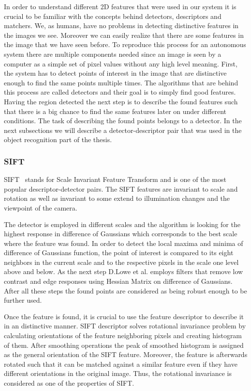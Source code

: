 In order to understand different 2D features that were used in our system it is crucial to be familiar with the concepts behind detectors, descriptors and matchers. We, as humans, have no problems in detecting distinctive features in the images we see. Moreover we can easily realize that there are some features in the image that we have seen before. To reproduce this process for an autonomous system there are multiple components needed since an image is seen by a computer as a simple set of pixel values without any high level meaning. First, the system has to detect points of interest in the image that are distinctive enough to find the same points multiple times. The algorithms that are behind this process are called detectors and their goal is to simply find good features. Having the region detected the next step is to describe the found features such that there is a big chance to find the same features later on under different conditions. The task of describing the found points belongs to a detector. In the next subsections we will describe a detector-descriptor pair that was used in the object recognition part of the thesis.

\subsubsection{SIFT}
SIFT~\cite{lowe2004distinctive} stands for Scale Invariant Feature Transform and is one of the most popular descriptor-detector pairs. The SIFT features are invariant to scale and rotation as well as invariant to some extend to illumination changes and the viewpoint of the camera.  

The detector is employed in different scales and the algorithm is looking for the highest response in difference of Gaussians which corresponds to the best scale where the feature was found. In order to detect the local maxima and minima of difference of Gaussians function, the point of interest is compared to its eight neighbors in the current scale and to the respective pixels in the scale one level above and below. As the next step D.Lowe et al. employs filters that remove low contrast and edge responses using Hessian Matrix on difference of Gaussians. After all these steps the found points are considered as being robust enough to be further used.

Once the feature is found, it is crucial to use the feature descriptor to describe it in an distinctive manner.  SIFT descriptor solves rotational invariance problem by calculating orientations of the feature neighboring pixels and creating histogram of them. After smoothing operations the peak of smoothed histogram is assigned as the general orientation of the SIFT feature. Moreover, the feature is afterwards rotated such that it can be matched against a similar feature even if they have different orientations in the original image. Thus, the rotational invariance is considered as one of the properties of SIFT.

